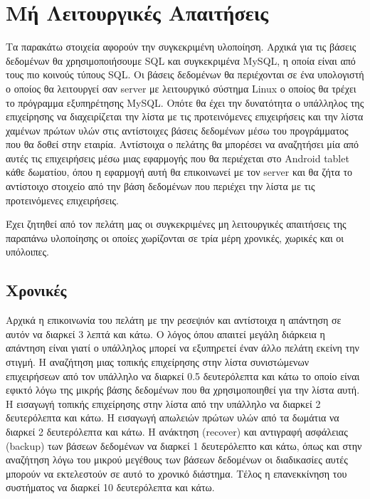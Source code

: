 \section{Μή Λειτουργικές Απαιτήσεις}
\label{3.2}
Τα παρακάτω στοιχεία αφορούν την συγκεκριμένη υλοποίηση. Αρχικά για τις βάσεις δεδομένων 
θα χρησιμοποιήσουμε SQL και συγκεκριμένα MySQL, η οποία είναι από τους πιο κοινούς 
τύπους SQL.  Οι βάσεις δεδομένων θα περιέχονται σε ένα υπολογιστή ο οποίος θα λειτουργεί 
σαν server με λειτουργικό σύστημα Linux ο οποίος θα τρέχει το πρόγραμμα εξυπηρέτησης MySQL. 
Οπότε θα έχει την δυνατότητα ο υπάλληλος της επιχείρησης να διαχειρίζεται την λίστα με τις 
προτεινόμενες επιχειρήσεις και την λίστα χαμένων πρώτων υλών στις αντίστοιχες βάσεις 
δεδομένων μέσω του προγράμματος που θα δοθεί στην εταιρία. Αντίστοιχα ο πελάτης θα 
μπορέσει να αναζητήσει μία από αυτές τις επιχειρήσεις μέσω μιας εφαρμογής που θα περιέχεται 
στο Android tablet κάθε δωματίου, όπου η εφαρμογή αυτή θα επικοινωνεί με τον server και θα ζήτα 
το αντίστοιχο στοιχείο από την βάση δεδομένων που περιέχει την λίστα με τις προτεινόμενες 
επιχειρήσεις.  

\noindent
Έχει ζητηθεί από τον πελάτη μας οι συγκεκριμένες μη λειτουργικές απαιτήσεις της παραπάνω 
υλοποίησης οι οποίες χωρίζονται σε τρία μέρη χρονικές, χωρικές και οι υπόλοιπες.

\subsection{Χρονικές}
Αρχικά η επικοινωνία του πελάτη με την ρεσεψιόν και αντίστοιχα η απάντηση σε αυτόν να 
διαρκεί 3 λεπτά και κάτω. Ο λόγος όπου απαιτεί μεγάλη διάρκεια η απάντηση είναι γιατί ο 
υπάλληλος μπορεί να εξυπηρετεί έναν άλλο πελάτη εκείνη την στιγμή. Η αναζήτηση μιας 
τοπικής επιχείρησης στην λίστα συνιστώμενων  επιχειρήσεων από τον υπάλληλο να διαρκεί 
0.5 δευτερόλεπτα και κάτω το οποίο είναι εφικτό λόγω της μικρής βάσης δεδομένων που θα 
χρησιμοποιηθεί για την λίστα αυτή. Η εισαγωγή τοπικής επιχείρησης στην λίστα από την 
υπάλληλο να διαρκεί 2 δευτερόλεπτα και κάτω.  Η εισαγωγή απωλειών πρώτων υλών από τα 
δωμάτια να διαρκεί 2 δευτερόλεπτα και κάτω. Η ανάκτηση (recover) και αντιγραφή ασφάλειας
(backup) των βάσεων δεδομένων να διαρκεί 1 δευτερόλεπτο και κάτω, όπως και στην αναζήτηση 
λόγω του μικρού μεγέθους των βάσεων δεδομένων οι διαδικασίες αυτές μπορούν να εκτελεστούν 
σε αυτό το χρονικό διάστημα. Τέλος η επανεκκίνηση του συστήματος να διαρκεί 10 
δευτερόλεπτα και κάτω.

\clearpage
